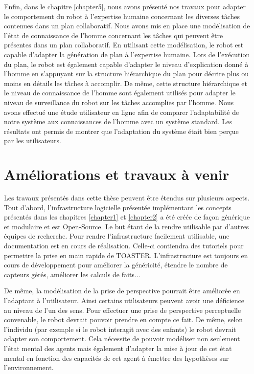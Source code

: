 \documentclass[a4paper,11pt,twoside]{StyleThese}
\begin{document}
Enfin, dans le chapitre \ref{chapter5}, nous avons présenté nos travaux pour adapter le comportement du robot à l'expertise humaine concernant les diverses tâches contenues dans un plan collaboratif. Nous avons mis en place une modélisation de l'état de connaissance de l'homme concernant les tâches qui peuvent être présentes dans un plan collaboratif. En utilisant cette modélisation, le robot est capable d'adapter la génération de plan à l'expertise humaine. Lors de l'exécution du plan, le robot est également capable d'adapter le niveau d'explication donné à l'homme en s'appuyant sur la structure hiérarchique du plan pour décrire plus ou moins en détails les tâches à accomplir. De même, cette structure hiérarchique et le niveau de connaissance de l'homme sont également utilisés pour adapter le niveau de surveillance du robot sur les tâches accomplies par l'homme. Nous avons effectué une étude utilisateur en ligne afin de comparer l'adaptabilité de notre système aux connaissances de l'homme avec un système standard. Les résultats ont permis de montrer que l'adaptation du système était bien perçue par les utilisateurs.


\section{Améliorations et travaux à venir}
Les travaux présentés dans cette thèse peuvent être étendus sur plusieurs aspects.
Tout d'abord, l'infrastructure logicielle présentée implémentant les concepts présentés dans les chapitres \ref{chapter1} et \ref{chapter2} a été créée de façon générique et modulaire et est Open-Source. Le but étant de la rendre utilisable par d'autres équipes de recherche. Pour rendre l'infrastructure facilement utilisable, une documentation est en cours de réalisation. Celle-ci contiendra des tutoriels pour permettre la prise en main rapide de TOASTER.
L'infrastructure est toujours en cours de développement pour améliorer la généricité, étendre le nombre de capteurs gérés, améliorer les calculs de faits...

De même, la modélisation de la prise de perspective pourrait être améliorée en l'adaptant à l'utilisateur. Ainsi certains utilisateurs peuvent avoir une déficience au niveau de l'un des sens. Pour effectuer une prise de perspective perceptuelle convenable, le robot devrait pouvoir prendre en compte ce fait.
De même, selon l'individu (par exemple si le robot interagit avec des enfants) le robot devrait adapter son comportement. Cela nécessite de pouvoir modéliser non seulement l'état mental des agents mais également d'adapter la mise à jour de cet état mental en fonction des capacités de cet agent à émettre des hypothèses sur l'environnement.
\end{document}
